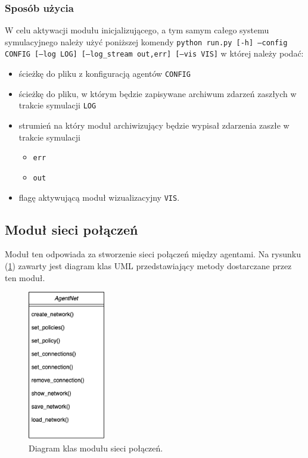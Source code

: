 \documentclass{article}
\begin{document}
\subsubsection{Sposób użycia}

W celu aktywacji modułu inicjalizującego, a tym samym całego systemu symulacyjnego należy użyć poniższej komendy 
\newline
\texttt{python run.py [-h] --config CONFIG [--log LOG] [--log\_stream {out,err}] [--vis VIS]}
\newline
w której należy podać:

\begin{itemize}
	\item ścieżkę do pliku z konfiguracją agentów \texttt{CONFIG}
	\item ścieżkę do pliku, w którym będzie zapisywane archiwum zdarzeń zaszłych w trakcie symulacji \texttt{LOG}
	\item strumień na który moduł archiwizujący będzie wypisał zdarzenia zaszłe w trakcie symulacji  
		\begin{itemize}
			\item \texttt{err}
			\item \texttt{out}
		\end{itemize}
	\item flagę aktywującą moduł wizualizacyjny \texttt{VIS}.
\end{itemize}
\subsection{Moduł sieci połączeń}
Moduł ten odpowiada za stworzenie sieci połączeń między agentami. Na rysunku (\ref{uml-net}) zawarty jest diagram 
klas UML przedstawiający metody dostarczane przez ten moduł.

\begin{figure}[H]
	\centering
	\includegraphics[width=0.3\textwidth, height=0.3\textheight]{./png/net-uml.png}
	\caption{Diagram klas modułu sieci połączeń.}
	\label{uml-net}
\end{figure}
\end{document}
